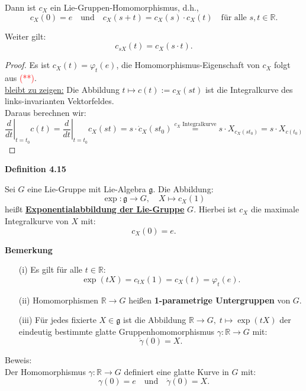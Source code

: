 \documentclass[fleqn, 12pt, letterpaper]{article}
\newcommand{\txt}[1]{\text{#1}}
\begin{document}
Dann ist \( c_X \) ein {Lie-Gruppen-Homomorphismus}, d.h.,
\[
c_X(0) = e \quad \text{und} \quad c_X(s + t) = c_X(s) \cdot c_X(t) \quad \text{für alle } s, t \in \mathbb{R}.
\]

Weiter gilt:
\[
c_{sX}(t) = c_X(s \cdot t).
\]

\begin{proof}
    Es ist \( c_X(t) = \varphi_t(e) \), die {Homomorphismus-Eigenschaft} von \( c_X \) folgt aus \textcolor{red}{(**)}. \\

\underline{bleibt zu zeigen:} Die Abbildung
\(
t \mapsto c(t) := c_X(st)
\)
ist die Integralkurve des links-invarianten Vektorfeldes. \\

Daraus berechnen wir:
\[
\left.\frac{d}{dt}\right|_{t = t_0} c(t)
= \left.\frac{d}{dt}\right|_{t = t_0} c_X(s t)
= s \cdot \dot{c}_X(s t_0)
\overset{c_X\txt{ Integralkurve}}{=} s \cdot X_{c_X(s t_0)}
= s \cdot X_{c(t_0)}
\]
\end{proof}



\textbf{Definition 4.15}

Sei \( G \) eine Lie-Gruppe mit Lie-Algebra \( \mathfrak{g} \). Die Abbildung:
\[
\exp : \mathfrak{g} \rightarrow G, \quad X \mapsto c_X(1)
\]
heißt \textbf{\underline{Exponentialabbildung der Lie-Gruppe}} \( G \). Hierbei ist \( c_X \) die maximale Integralkurve von \( X \) mit:
\[
c_X(0) = e.
\]

\textbf{Bemerkung}

\begin{itemize}
    \item[(i)] Es gilt für alle \( t \in \mathbb{R} \):
    \[
    \exp(tX) =c_{tX}(1)= c_X(t)=\varphi_t(e).
    \]

    \item[(ii)] Homomorphismen \( \mathbb{R} \rightarrow G \) heißen \textbf{1-parametrige Untergruppen} von \( G \).


    \item[(iii)] Für jedes fixierte \( X \in \mathfrak{g} \) ist die Abbildung \( \mathbb{R} \rightarrow G, \; t \mapsto \exp(tX) \) der eindeutig bestimmte glatte Gruppenhomomorphismus \( \gamma : \mathbb{R} \rightarrow G \) mit:
    \[
    \dot{\gamma}(0) = X.
    \]
\end{itemize}
Beweis:\\
Der Homomorphismus \( \gamma : \mathbb{R} \rightarrow G \) definiert eine glatte Kurve in \( G \) mit:
\[
\gamma(0) = e \quad \text{und} \quad \dot{\gamma}(0) = X.
\]
\end{document}
